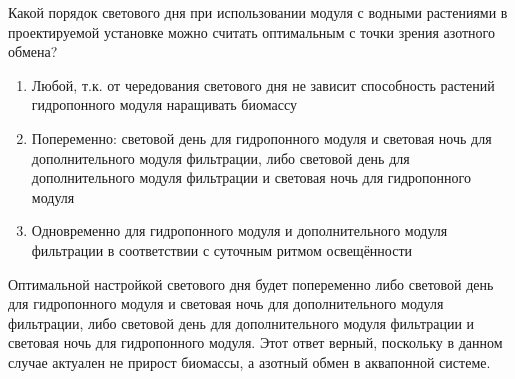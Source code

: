 
Какой порядок светового дня при использовании модуля с водными растениями в проектируемой установке можно считать оптимальным с точки зрения азотного обмена?

\begin{enumerate}
    \item Любой, т.к. от чередования светового дня не зависит способность растений гидропонного модуля наращивать биомассу
    \item Попеременно: световой день для гидропонного модуля и световая ночь для дополнительного модуля фильтрации, либо световой день для дополнительного модуля фильтрации и световая ночь для гидропонного модуля
    \item Одновременно для гидропонного модуля и дополнительного модуля фильтрации в соответствии с суточным ритмом освещённости
\end{enumerate}

\explanationSection

Оптимальной настройкой светового дня будет попеременно либо световой день для гидропонного модуля и световая ночь для дополнительного модуля фильтрации, либо световой день для дополнительного модуля фильтрации и световая ночь для гидропонного модуля. Этот ответ верный, поскольку в данном случае актуален не прирост биомассы, а азотный обмен в аквапонной системе.

